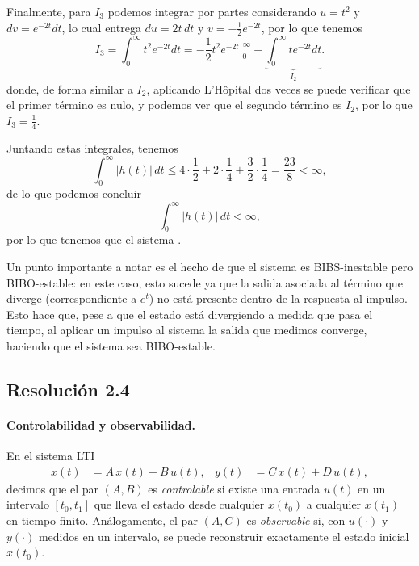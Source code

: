 \documentclass[
  11pt,
  letterpaper,
   addpoints,
   answers
  ]{exam}
\begin{document}
\begin{questions}
\begin{solution}
Finalmente, para $I_3$ podemos integrar por partes considerando $u=t^{2}$ y $dv=e^{-2t}dt$, lo cual entrega
$du=2t\,dt$ y $v=-\tfrac{1}{2}e^{-2t}$, por lo que tenemos
\begin{equation}
I_3=\int_{0}^{\infty} t^{2}e^{-2t}dt
=-\frac{1}{2}t^{2}e^{-2t}\Big|_{0}^{\infty}
+\underbrace{\int_{0}^{\infty} t e^{-2t}dt}_{I_2}.
\end{equation}
donde, de forma similar a $I_2$, aplicando L'H\^opital dos veces se puede verificar que el primer término
es nulo, y podemos ver que el segundo término es $I_2$, por lo que $I_3=\tfrac{1}{4}$.

Juntando estas integrales, tenemos
\begin{equation}
\int_{0}^{\infty} |h(t)|\,dt
\le 4\cdot\frac{1}{2}+2\cdot\frac{1}{4}+\frac{3}{2}\cdot\frac{1}{4}
= \frac{23}{8} < \infty,
\end{equation}
de lo que podemos concluir
\begin{equation}
\int_{0}^{\infty} |h(t)|\,dt < \infty,
\end{equation}
por lo que tenemos que el sistema .

Un punto importante a notar es el hecho de que el sistema es BIBS-inestable pero BIBO-estable:
en este caso, esto sucede ya que la salida asociada al término que diverge (correspondiente a $e^{t}$) no
está presente dentro de la respuesta al impulso. Esto hace que, pese a que el estado está divergiendo a
medida que pasa el tiempo, al aplicar un impulso al sistema la salida que medimos converge, haciendo
que el sistema sea BIBO-estable.
\subsection*{Resolución 2.4}


\paragraph{Controlabilidad y observabilidad.}
En el sistema LTI
\begin{align}
\dot x(t) &= A\,x(t) + B\,u(t), &
y(t) &= C\,x(t) + D\,u(t),
\end{align}
decimos que el par $(A,B)$ es \emph{controlable} si existe una entrada $u(t)$ en un intervalo $[t_0,t_1]$
que lleva el estado desde cualquier $x(t_0)$ a cualquier $x(t_1)$ en tiempo finito. Análogamente, el par
$(A,C)$ es \emph{observable} si, con $u(\cdot)$ y $y(\cdot)$ medidos en un intervalo, se puede reconstruir
exactamente el estado inicial $x(t_0)$.


\end{solution}
\end{questions}
\end{document}
